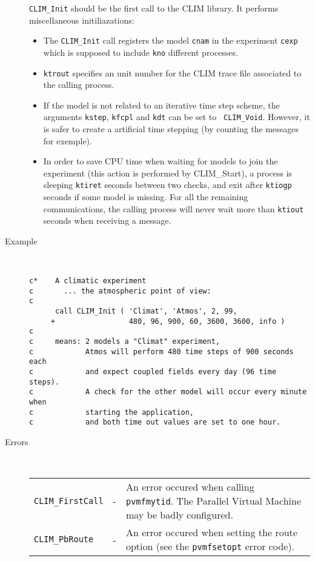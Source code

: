 \begin{description}
    {\tt CLIM\_Init} should be the first call to the CLIM library.
    It performs miscellaneous initiliazations:
    \begin{itemize}
      \item The {\tt CLIM\_Init} call registers the model {\tt cnam}
      in the experiment {\tt cexp} which is supposed to include
      {\tt kno} different processes. \\
      \item {\tt ktrout} specifies an unit number for the CLIM trace file
      associated to the calling process.\\
      \item If the model is not related to an iterative time step scheme, the
      arguments {\tt kstep}, {\tt kfcpl} and {\tt kdt} can be set to {\tt
      CLIM\_Void}. However, it is safer to create a artificial time stepping
      (by counting the messages for exemple). \\
      \item In order to save CPU time when waiting for models to join the
      experiment (this action is performed by CLIM\_Start), a process
      is sleeping {\tt ktiret} seconds between two checks, and exit
      after {\tt ktiogp} seconds if some model is missing.
      For all the remaining communications, the calling process will never
      wait more than {\tt ktiout} seconds when receiving a message.
    \end{itemize}
  \item[Example]~
    \begin{verbatim}
c*    A climatic experiment
c       ... the atmospheric point of view:
c
      call CLIM_Init ( 'Climat', 'Atmos', 2, 99,
     +                 480, 96, 900, 60, 3600, 3600, info )
c
c     means: 2 models a "Climat" experiment,
c            Atmos will perform 480 time steps of 900 seconds each
c            and expect coupled fields every day (96 time steps).
c            A check for the other model will occur every minute when
c            starting the application,
c            and both time out values are set to one hour.
    \end{verbatim}
  \item[Errors]~\\[10pt]
    \begin{tabular}{l l p{10cm} }
      {\tt CLIM\_FirstCall} & - & An error occured when calling {\tt
pvmfmytid}. The Parallel Virtual Machine may be badly configured. \\
      {\tt CLIM\_PbRoute} & - & An error occured when setting the route
option (see the {\tt pvmfsetopt} error code). \\
    \end{tabular}
\end{description}
